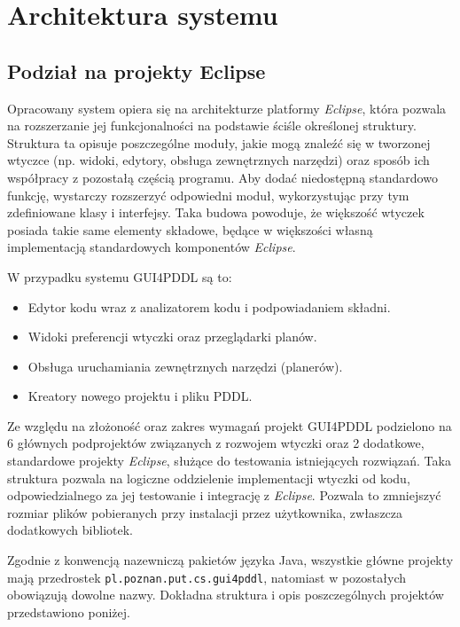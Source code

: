 \chapter{Architektura systemu}
\section{Podział na projekty Eclipse}

Opracowany system opiera się na architekturze platformy \emph{Eclipse}, która pozwala na rozszerzanie jej funkcjonalności na podstawie ściśle określonej struktury. Struktura ta opisuje poszczególne moduły, jakie mogą znaleźć się w tworzonej wtyczce (np. widoki, edytory, obsługa zewnętrznych narzędzi) oraz sposób ich współpracy z pozostałą częścią programu. Aby dodać niedostępną standardowo funkcję, wystarczy rozszerzyć odpowiedni moduł, wykorzystując przy tym zdefiniowane klasy i interfejsy. Taka budowa powoduje, że większość wtyczek posiada takie same elementy składowe, będące w większości własną implementacją standardowych komponentów \emph{Eclipse}.

W przypadku systemu GUI4PDDL są to:
\begin{itemize}
\item Edytor kodu wraz z analizatorem kodu i podpowiadaniem składni.
\item Widoki preferencji wtyczki oraz przeglądarki planów.
\item Obsługa uruchamiania zewnętrznych narzędzi (planerów).
\item Kreatory nowego projektu i pliku PDDL.
\end{itemize}

Ze względu na złożoność oraz zakres wymagań projekt GUI4PDDL podzielono na 6 głównych podprojektów związanych z rozwojem wtyczki oraz 2 dodatkowe, standardowe projekty \emph{Eclipse}, służące do testowania istniejących rozwiązań. Taka struktura pozwala na logiczne oddzielenie implementacji wtyczki od kodu, odpowiedzialnego za jej testowanie i integrację z \emph{Eclipse}. Pozwala to zmniejszyć rozmiar plików pobieranych przy instalacji przez użytkownika, zwłaszcza dodatkowych bibliotek.

Zgodnie z konwencją nazewniczą pakietów języka Java, wszystkie główne projekty mają przedrostek \texttt{pl.poznan.put.cs.gui4pddl}, natomiast w pozostałych obowiązują dowolne nazwy. Dokładna struktura i opis poszczególnych projektów przedstawiono poniżej.


